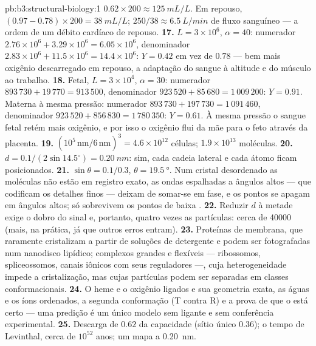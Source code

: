 \begin{solution}{pb:b3:structural-biology:1}
$0.62\times 200 \approx \qty{125}{mL/L}$. Em repouso,
$(0.97 - 0.78)\times
200 = \qty{38}{mL/L}$; $250/38 \approx \qty{6.5}{L/min}$ de fluxo sanguíneo --- a ordem de um débito cardíaco
de repouso.
\textbf{17.} $L = 3\times 10^{6}$, $\alpha = 40$: numerador $2.76\times
10^{6} + 3.29\times 10^{6} = 6.05\times 10^{6}$, denominador $2.83\times
10^{6} + 11.5\times 10^{6} = 14.4\times 10^{6}$: $Y = 0.42$ em vez de
$0.78$ --- bem mais oxigênio descarregado em repouso, a adaptação do
sangue à altitude e do músculo ao trabalho.
\textbf{18.} Fetal, $L = 3\times 10^{4}$, $\alpha = 30$: numerador
$893\,730 + 19\,770 = 913\,500$, denominador $923\,520 + 85\,680 =
1\,009\,200$: $Y = 0.91$. Materna à mesma pressão: numerador
$893\,730 + 197\,730 = 1\,091\,460$, denominador $923\,520 + 856\,830
= 1\,780\,350$: $Y = 0.61$. À mesma pressão o sangue fetal retém mais
oxigênio, e por isso o oxigênio flui da mãe para o feto através da
placenta.
\textbf{19.} $(10^{5}\,\text{nm}/6\,\text{nm})^{3} = 4.6\times 10^{12}$
células; $1.9\times 10^{13}$ moléculas.
\textbf{20.} $d = 0.1/(2\sin 14.5^{\circ}) = \qty{0.20}{nm}$: sim, cada
cadeia lateral e cada átomo ficam posicionados.
\textbf{21.} $\sin\theta = 0.1/0.3$, $\theta = \qty{19.5}{\degree}$. Num
cristal desordenado as moléculas não estão em registro exato, as ondas
espalhadas a ângulos altos --- que codificam os detalhes finos --- deixam
de somar-se em fase, e os pontos se apagam em ângulos altos; só
sobrevivem os pontos de baixa .
\textbf{22.} Reduzir $d$ à metade exige o dobro do sinal e, portanto,
quatro vezes as partículas: cerca de \num{40000} (mais, na prática, já
que outros erros entram).
\textbf{23.} Proteínas de membrana, que raramente cristalizam a partir
de soluções de detergente e podem ser fotografadas num nanodisco
lipídico; complexos grandes e flexíveis --- ribossomos, spliceossomos,
canais iônicos com seus reguladores ---, cuja heterogeneidade impede a
cristalização, mas cujas partículas podem ser separadas em classes
conformacionais.
\textbf{24.} O heme e o oxigênio ligados e sua geometria exata, as
águas e os íons ordenados, a segunda conformação (T contra R) e a prova
de que o  está certo --- uma predição é um único modelo sem
ligante e sem conferência experimental.
\textbf{25.} Descarga de $0.62$ da capacidade (sítio único $0.36$); o
tempo de Levinthal, cerca de $10^{52}$ anos; um mapa a \qty{0.20}{nm}.
\end{solution}
